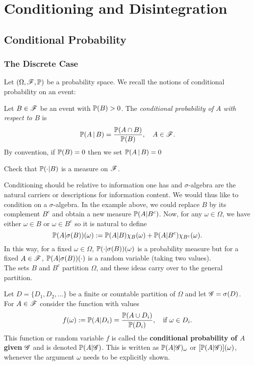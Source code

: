 \section{Conditioning and Disintegration}
\subsection{Conditional Probability}
\subsubsection{The Discrete Case}
Let $(\Omega, \mathcal{F}, \mathbb{P})$ be a probability space. We recall the notions of conditional probability on an event: 

\begin{definition}
Let $B \in \mathcal{F}$ be an event with $\mathbb{P}(B) > 0$. The \textit{conditional probability of $A$ with respect to $B$} is 
\begin{equation}
    \mathbb{P}(A \,|\, B) = \frac{\mathbb{P}(A \cap B)}{\mathbb{P}(B)}, \quad A\in \mathcal{F}.
\end{equation}
By convention, if $\mathbb{P}(B) = 0$ then we set $\mathbb{P}(A \,|\, B) = 0$
\end{definition}

\begin{exercise}
Check that $\mathbb{P}(\cdot | B)$ is a measure on $\mathcal{F}$.
\end{exercise}

Conditioning should be relative to information one has and $\sigma$-algebra are the natural carriers or descriptions for information content. We would thus like to condition on a $\sigma$-algebra. In the example above, we could replace $B$ by its complement $B^c$ and obtain a new measure $\mathbb{P}(A|B^c)$. Now, for any $\omega \in \Omega$, we have either $\omega \in B$ or $\omega \in B^c$ so it is natural to define
\begin{equation}
    \mathbb{P}(A | \sigma(B))(\omega) := \mathbb{P}(A|B)\chi_B(\omega) + \mathbb{P}(A | B^c)\chi_{B^c}(\omega).
\end{equation}
In this way, for a fixed $\omega \in \Omega$, $\mathbb{P}(\cdot | \sigma(B))(\omega)$ is a probability measure but for a fixed $A\in \mathcal{F}$, $\mathbb{P}(A|\sigma(B))(\cdot)$ is a random variable (taking two values).\\

The sets $B$ and $B^c$ partition $\Omega$, and these ideas carry over to the general partition. 
\begin{definition}
    Let $D = \{D_1, D_2, \dots \}$ be a finite or countable partition of $\Omega$ and let $\mathcal{G} = \sigma(D)$. For $A \in \mathcal{F}$ consider the function with values
    \begin{equation} \label{eq:conditional_probability_partition}
        f(\omega) := \mathbb{P}(A | D_i) = \frac{\mathbb{P}(A\cup D_i)}{\mathbb{P}(D_i)}, \quad \text{if }\omega \in D_i.
    \end{equation}
    This function or random variable $f$ is called the \textbf{conditional probability of $A$ given $\mathcal{G}$} and is denoted $\mathbb{P}(A | \mathcal{G})$. This is written as $\mathbb{P}(A | \mathcal{G})_\omega$ or $[\mathbb{P}(A | \mathcal{G})](\omega)$, whenever the argument $\omega$ needs to be explicitly shown.
\end{definition}

